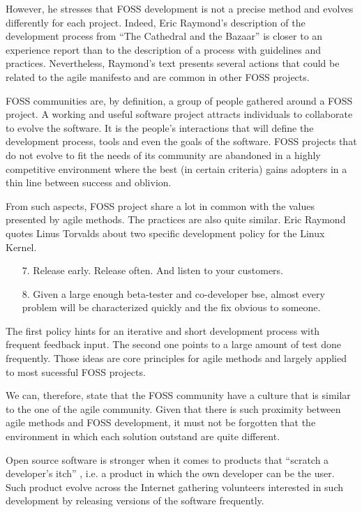 \documentclass[lnbip]{svmultln}
\begin{document}
However, he stresses that FOSS development is not a precise method and
evolves differently for each project. Indeed, Eric Raymond's
description of the development process from ``The Cathedral and the
Bazaar'' \cite{raymond1999} is closer to an experience report than to
the description of a process with guidelines and
practices. Nevertheless, Raymond's text presents several actions that
could be related to the agile manifesto \cite{url:agilemanifesto} and
are common in other FOSS projects.

FOSS communities are, by definition, a group of people gathered around
a FOSS project. A working and useful software project attracts
individuals to collaborate to evolve the
software\cite{crowston2002}. It is the people's interactions that will
define the development process, tools and even the goals of the
software. FOSS projects that do not evolve to fit the needs of its
community are abandoned in a highly competitive environment where the
best (in certain criteria) gains adopters in a thin line between
success and oblivion.

From such aspects, FOSS project share a lot in common with the values
presented by agile methods. The practices are also quite similar. Eric
Raymond quotes Linus Torvalds about two specific development policy
for the Linux Kernel.
\begin{enumerate}
\item[7.] Release early. Release often. And listen to your customers.
\item[8.] Given a large enough beta-tester and co-developer bse,
  almost every problem will be characterized quickly and the fix
  obvious to someone.
\end{enumerate}

The first policy hints for an iterative and short development process
with frequent feedback input. The second one points to a large amount
of test done frequently. Those ideas are core principles for agile
methods and largely applied to most sucessful FOSS projects.

We can, therefore, state that the FOSS community have a culture that
is similar to the one of the agile community. Given that there is such
proximity between agile methods and FOSS development, it must not be
forgotten that the environment in which each solution outstand are
quite different.

Open source software is stronger when it comes to products that
``scratch a developer's itch'' \cite{fitzgerald2000}, i.e. a product in
which the own developer can be the user. Such product evolve across
the Internet gathering volunteers interested in such development by
releasing versions of the software frequently.
\end{document}
